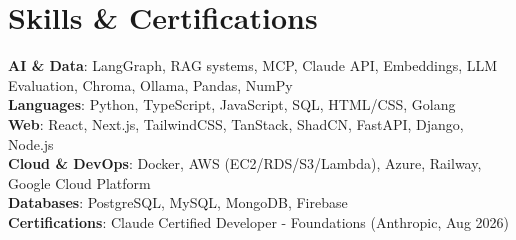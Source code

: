 \documentclass[letterpaper,11pt]{article}
\begin{document}
\section{Skills \& Certifications}
 \begin{itemize}[leftmargin=0.15in, label={}]
    \small{\item{
     \textbf{AI \& Data}{: LangGraph, RAG systems, MCP, Claude API, Embeddings, LLM Evaluation, Chroma, Ollama, Pandas, NumPy} \\
     \textbf{Languages}{: Python, TypeScript, JavaScript, SQL, HTML/CSS, Golang} \\
     \textbf{Web}{: React, Next.js, TailwindCSS, TanStack, ShadCN, FastAPI, Django, Node.js} \\
     \textbf{Cloud \& DevOps}{: Docker, AWS (EC2/RDS/S3/Lambda), Azure, Railway, Google Cloud Platform} \\
     \textbf{Databases}{: PostgreSQL, MySQL, MongoDB, Firebase} \\
     \textbf{Certifications}{: Claude Certified Developer - Foundations (Anthropic, Aug 2026)}
    }}
 \end{itemize}


\end{document}
